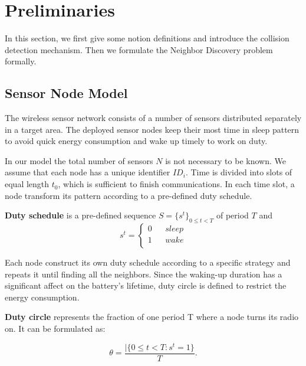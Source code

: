 \section{Preliminaries}
\label{sectionmodel}

In this section, we first give some notion definitions and introduce the collision detection mechanism. 
Then we formulate the Neighbor Discovery problem formally.  


\subsection{Sensor Node Model}

The wireless sensor network consists of a number of sensors distributed separately in a target area.
The deployed sensor nodes keep their most time in sleep pattern to avoid quick energy consumption 
and wake up timely to work on duty.

In our model the total number of sensors $N$  is not necessary to be known. We assume that each node has a unique identifier $ID_i$. Time is divided into slots of equal length $t_0$, 
which is sufficient to finish communications. In each time slot, a node transform its pattern according to a pre-defined duty schedule.

\begin{definition}
\textbf{Duty schedule} is a pre-defined sequence $S=\{s^t\}_{0\leq t<T}$ of period $T$ and
$$ s^t=\left\{
\begin{aligned}
0  & & {sleep}\\
1  & & {wake}\\
\end{aligned}
\right.
$$
\end{definition}

 Each node construct its own duty schedule according to a specific strategy and repeats it
 until finding all the neighbors. Since the waking-up duration has a significant affect on the battery's lifetime, 
 duty circle is defined to restrict the energy consumption.

\begin{definition}
\textbf{Duty circle} represents the fraction of one period T where a node turns its radio on. It can be formulated as:

$$\theta=\frac{|\{ 0\leq t<T : s^t =1\}}{T}.
$$
  
\end{definition}

